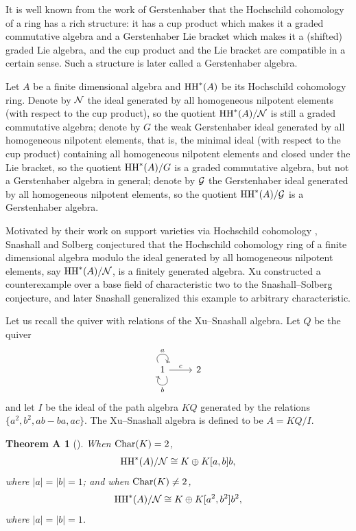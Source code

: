 \documentclass[10pt, reqno]{amsart}
\newtheorem*{thmA}{Theorem A}
\theoremstyle{definition}
\theoremstyle{remark}
\numberwithin{equation}{section}
\begin{document}
It is well known from the work of Gerstenhaber \cite{Ger63} that the  Hochschild cohomology  of a ring has a rich structure: it has a cup product which makes it a graded commutative algebra and a Gerstenhaber  Lie bracket which makes it a (shifted) graded Lie algebra, and the cup product and the Lie bracket are compatible in a  certain sense. Such a structure is later called a Gerstenhaber algebra.  


Let $A$ be a finite dimensional algebra and $\mathrm{HH}^*(A)$ be its Hochschild cohomology ring. 
Denote by $\mathcal{N}$ the ideal generated by  all homogeneous nilpotent elements (with respect to the cup product), so  the quotient $\mathrm{HH}^*(A)/\mathcal{N}$ is still a graded commutative algebra;
denote by  $G$ the weak Gerstenhaber ideal  generated by all  homogeneous nilpotent elements, that is, the minimal ideal (with respect to the cup product) containing all homogeneous nilpotent elements and closed under the Lie bracket, so  the quotient $\mathrm{HH}^*(A)/G$ is a graded commutative algebra, but not a Gerstenhaber algebra in general; 
denote by $\mathcal{G}$ the Gerstenhaber ideal generated by all homogeneous nilpotent elements, so the quotient $\mathrm{HH}^*(A)/\mathcal{G}$ is a Gerstenhaber algebra.


Motivated by their work on support varieties via Hochschild cohomology \cite{SS04, EHTSS04}, 
Snashall and Solberg \cite{SS04} conjectured that the Hochschild cohomology ring of a finite dimensional algebra modulo the ideal generated by all homogeneous nilpotent elements, say $\mathrm{HH}^*(A)/\mathcal{N}$, is a finitely generated algebra. Xu \cite{Xu08} constructed a counterexample over a base field of characteristic two to the Snashall--Solberg conjecture, and later Snashall \cite{Sna09} generalized this example to arbitrary characteristic.
 
Let us recall the quiver with relations of the Xu--Snashall algebra. Let $Q$ be the quiver
\[
\begin{tikzcd}
    1 \arrow[loop above, out =120, in =60, looseness=4,"a"] \arrow[loop below,out =300, in =240, looseness=5,"b"] \arrow[r,"c"] & 2
\end{tikzcd}
\] 
and let $I$ be the ideal of the path algebra $KQ$ generated by the relations $\{a^2, b^2, ab-ba, ac\}$. The Xu--Snashall algebra is defined to be $A=KQ/I$.  
\begin{thmA} [\cite{Xu08, Sna09}] 
When $\mathrm{Char}(K)= 2$,
\[\mathrm{HH}^*(A)/\mathcal{N} \cong  K \oplus K[a,b]b,
    \]
where $|a|=|b| = 1$; and when $\mathrm{Char}(K)\neq 2$, 
\[ \mathrm{HH}^*(A)/\mathcal{N} \cong  K \oplus K[a^2,b^2]b^2,\]
where $|a|=|b| = 1$. 
\end{thmA}
\end{document}
